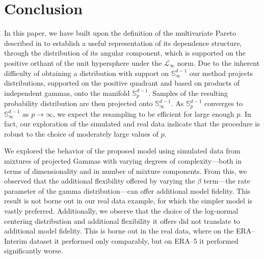 \section{Conclusion\label{sec:conclusion}}
In this paper, we have built upon the definition of the multivariate Pareto 
    described in \cite{ferreira2014} to establish a useful representation of 
    its dependence structure, through the distribution of its angular component,
    which is supported on the positive orthant of the unit hypersphere under 
    the $\mathcal{L}_{\infty}$ norm.  Due to the inherent difficulty of 
    obtaining a distribution with support on ${\mathbb S}^{d-1}_\infty$ our 
    method projects distributions, supported on the positive quadrant and 
    based on products of independent gammas,  onto the manifold 
    ${\mathbb S}_{p}^{d-1}$. Samples of the resulting probability distribution 
    are then projected onto ${\mathbb S}_{\infty}^{d-1}$.  As 
    ${\mathbb S}_{p}^{d-1}$ converges to ${\mathbb S}_{\infty}^{d-1}$ as 
    $p\to\infty$, we expect the resampling to be efficient for large enough
    $p$. In fact, our exploration of the simulated and real data indicate
    that the procedure is robust to the choice of moderately large values
    of $p$. 
 
We explored the behavior of the proposed model using simulated data from
    mixtures of projected Gammas with varying degrees of complexity---both 
    in terms of dimensionality and in number of mixture components.  From this,
    we observed that the additional flexibility offered by varying the $\beta$
    term---the rate parameter of the gamma distribution---can offer additional
    model fidelity.  This result is not borne out in our real data example,
    for which the simpler model is vastly preferred.  Additionally, we observe
    that the choice of the log-normal centering distribution and additional
    flexibility it offers did not translate to additional model fidelity.  This
    is borne out in the real data, where on the ERA--Interim dataset it performed
    only comparably, but on ERA--5 it performed significantly worse.
    
    
